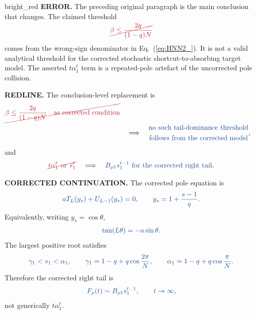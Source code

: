 \documentclass[10pt, hidelinks, superscriptaddress, amsmath, amssymb, aps, pre]{revtex4-2}
\newcommand{\auditlabel}[1]{\textbf{\textcolor{audit_blue}{#1}}}
\newcommand{\auditcorrected}[1]{\textcolor{audit_blue}{#1}}
\newcommand{\auditmathwrong}[1]{\textcolor{bright_red}{\cancel{#1}}}
\newcommand{\auditarrow}{\quad\Longrightarrow\quad}
\begin{document}
\begin{auditbox}{bright_red}
\auditlabel{ERROR.}  The preceding original paragraph is the main conclusion
that changes.  The claimed threshold
\[
\auditmathwrong{\beta\leq \frac{2q}{(1-q)N}}
\]
comes from the wrong-sign denominator in Eq.~(\ref{eq:HNN2_}).  It is not a
valid analytical threshold for the corrected stochastic shortcut-to-absorbing
target model.  The asserted $t\alpha_1^t$ term is a repeated-pole artefact of
the uncorrected pole collision.

\auditlabel{REDLINE.}  The conclusion-level replacement is
\begin{align}
\auditmathwrong{\beta\leq \frac{2q}{(1-q)N}
\quad\hbox{as corrected condition}}
\nonumber\\
&\auditarrow
\auditcorrected{
\begin{gathered}
\hbox{no such tail-dominance threshold}\\
\hbox{follows from the corrected model}
\end{gathered}},
\label{eq:audit_redline_beta_threshold}
\end{align}
and
\begin{align}
\auditmathwrong{t\alpha_1^t\ \hbox{or}\ s_1^t}
\auditarrow
\auditcorrected{B_{\rho1}s_1^{t-1}\ \hbox{for the corrected right tail}} .
\label{eq:audit_redline_tail}
\end{align}

\auditlabel{CORRECTED CONTINUATION.}  The corrected pole equation is
\begin{align}
\auditcorrected{
aT_L(y_s)+U_{L-1}(y_s)=0,\qquad
y_s=1+\frac{s-1}{q}.}
\label{eq:audit_corrected_pole_y}
\end{align}
Equivalently, writing $y_s=\cos\theta$,
\begin{align}
\auditcorrected{\tan(L\theta)=-a\sin\theta.}
\label{eq:audit_corrected_pole_theta}
\end{align}
The largest positive root satisfies
\begin{align}
\auditcorrected{
\gamma_1<s_1<\alpha_1,\qquad
\gamma_1=1-q+q\cos\frac{2\pi}{N},\qquad
\alpha_1=1-q+q\cos\frac{\pi}{N}.}
\label{eq:audit_corrected_root_order}
\end{align}
Therefore the corrected right tail is
\begin{align}
\auditcorrected{F_\rho(t)\sim B_{\rho1}s_1^{t-1},\qquad t\to\infty,}
\label{eq:audit_corrected_tail}
\end{align}
not generically $t\alpha_1^t$.


\end{auditbox}
\end{document}
